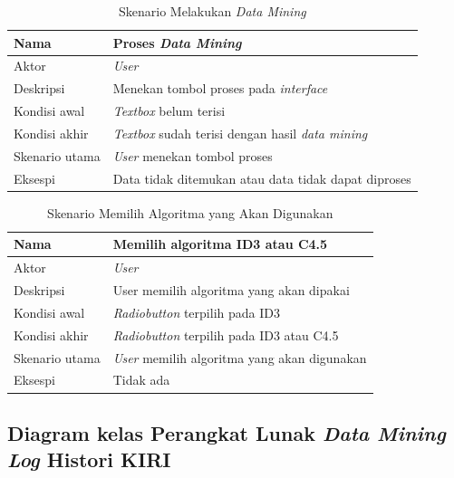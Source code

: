 \begin{table}[H]
\centering
\caption{Skenario Melakukan \textsl{Data Mining}}
\begin{tabular}{|l|l|}
\hline
Nama           & Proses \textsl{Data Mining }                      								\\ \hline
Aktor          & \textit{User}                                 										\\ \hline
Deskripsi      & Menekan tombol proses pada \textsl{interface}       					    \\ \hline
Kondisi awal   & \textsl{Textbox} belum terisi                          					\\ \hline
Kondisi akhir  & \textsl{Textbox} sudah terisi dengan hasil \textsl{data mining}  \\ \hline
Skenario utama & \textit{User} menekan tombol proses         										  \\ \hline
Eksespi        & Data tidak ditemukan atau data tidak dapat diproses    		  	  \\ \hline
\end{tabular}
\end{table}

\begin{table}[H]
\centering
\caption{Skenario Memilih Algoritma yang Akan Digunakan}
\begin{tabular}{|l|l|}
\hline
Nama           & Memilih algoritma ID3 atau C4.5                     \\ \hline
Aktor          & \textit{User}                                       \\ \hline
Deskripsi      & User memilih algoritma yang akan dipakai            \\ \hline
Kondisi awal   & \textsl{Radiobutton} terpilih pada ID3              \\ \hline
Kondisi akhir  & \textsl{Radiobutton} terpilih pada ID3 atau C4.5    \\ \hline
Skenario utama & \textit{User} memilih algoritma yang akan digunakan \\ \hline
Eksespi        & Tidak ada																					 \\ \hline
\end{tabular}
\end{table}


\subsection{Diagram kelas Perangkat Lunak \textsl{Data Mining Log} Histori KIRI}

